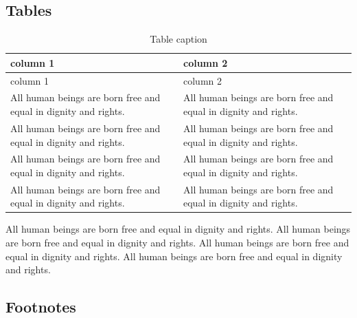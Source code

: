 \documentclass[
  ngerman,
  american,
  ]{scrartcl}
\begin{document}
\subsection{Tables}\label{tables}

\begin{longtable}[]{@{}
  >{\raggedright\arraybackslash}p{}
  >{\raggedright\arraybackslash}p{}@{}}
\caption{Table caption}\tabularnewline
\toprule\noalign{}
\begin{minipage}[b]{\linewidth}\raggedright
column 1
\end{minipage} & \begin{minipage}[b]{\linewidth}\raggedright
column 2
\end{minipage} \\
\midrule\noalign{}
\endfirsthead
\toprule\noalign{}
\begin{minipage}[b]{\linewidth}\raggedright
column 1
\end{minipage} & \begin{minipage}[b]{\linewidth}\raggedright
column 2
\end{minipage} \\
\midrule\noalign{}
\endhead
\bottomrule\noalign{}
\endlastfoot
All human beings are born free and equal in dignity and rights. & All
human beings are born free and equal in dignity and rights. \\
All human beings are born free and equal in dignity and rights. & All
human beings are born free and equal in dignity and rights. \\
All human beings are born free and equal in dignity and rights. & All
human beings are born free and equal in dignity and rights. \\
All human beings are born free and equal in dignity and rights. & All
human beings are born free and equal in dignity and rights. \\
\end{longtable}

All human beings are born free and equal in dignity and rights. All
human beings are born free and equal in dignity and rights. All human
beings are born free and equal in dignity and rights. All human beings
are born free and equal in dignity and rights.

\subsection{Footnotes}\label{footnotes}
\end{document}
